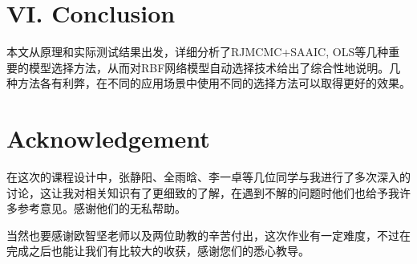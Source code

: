 \documentclass[twocolumn]{article}
\begin{document}
\section*{\centering VI. Conclusion}

本文从原理和实际测试结果出发，详细分析了RJMCMC+SA\/AIC, OLS等几种重要的模型选择方法，从而对RBF网络模型自动选择技术给出了综合性地说明。几种方法各有利弊，在不同的应用场景中使用不同的选择方法可以取得更好的效果。

\section*{\centering Acknowledgement}

在这次的课程设计中，张静阳、全雨晗、李一卓等几位同学与我进行了多次深入的讨论，这让我对相关知识有了更细致的了解，在遇到不解的问题时他们也给予我许多参考意见。感谢他们的无私帮助。

当然也要感谢欧智坚老师以及两位助教的辛苦付出，这次作业有一定难度，不过在完成之后也能让我们有比较大的收获，感谢您们的悉心教导。

\renewcommand{\refname}{\hfil References}


\end{document}
